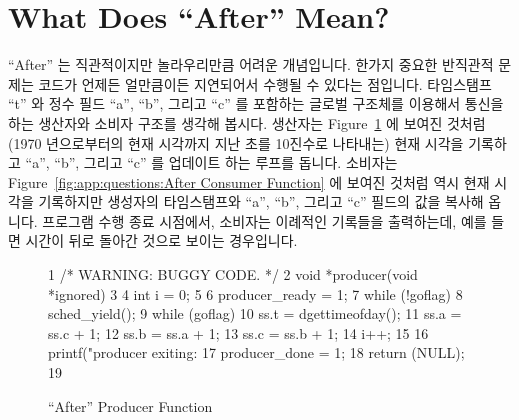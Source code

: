 
\section{What Does ``After'' Mean?}
\label{sec:app:questions:What Does ``After'' Mean?}

``After'' 는 직관적이지만 놀라우리만큼 어려운 개념입니다.
한가지 중요한 반직관적 문제는 코드가 언제든 얼만큼이든 지연되어서 수행될 수
있다는 점입니다.
타임스탬프 ``t'' 와 정수 필드 ``a'', ``b'', 그리고 ``c'' 를 포함하는 글로벌
구조체를 이용해서 통신을 하는 생산자와 소비자 구조를 생각해 봅시다.
생산자는
Figure~\ref{fig:app:questions:After Producer Function} 에 보여진 것처럼
(1970 년으로부터의 현재 시각까지 지난 초를 10진수로 나타내는) 현재 시각을
기록하고 ``a'', ``b'', 그리고 ``c'' 를 업데이트 하는 루프를 돕니다.
소비자는
Figure~\ref{fig:app:questions:After Consumer Function} 에 보여진 것처럼 역시
현재 시각을 기록하지만 생성자의 타임스탬프와 ``a'', ``b'', 그리고 ``c'' 필드의
값을 복사해 옵니다.
프로그램 수행 종료 시점에서, 소비자는 이례적인 기록들을 출력하는데, 예를 들면
시간이 뒤로 돌아간 것으로 보이는 경우입니다.
\iffalse

``After'' is an intuitive, but surprisingly difficult concept.
An important non-intuitive issue is that code can be delayed at
any point for any amount of time.
Consider a producing and a consuming thread that communicate using
a global struct with a timestamp ``t'' and integer fields ``a'', ``b'',
and ``c''.
The producer loops recording the current time
(in seconds since 1970 in decimal),
then updating the values of ``a'', ``b'', and ``c'',
as shown in Figure~\ref{fig:app:questions:After Producer Function}.
The consumer code loops, also recording the current time, but also
copying the producer's timestamp along with the fields ``a'',
``b'', and ``c'', as shown in
Figure~\ref{fig:app:questions:After Consumer Function}.
At the end of the run, the consumer outputs a list of anomalous recordings,
e.g., where time has appeared to go backwards.
\fi

\begin{figure}[htbp]
{ \scriptsize
\begin{verbbox}
  1 /* WARNING: BUGGY CODE. */
  2 void *producer(void *ignored)
  3 {
  4   int i = 0;
  5
  6   producer_ready = 1;
  7   while (!goflag)
  8     sched_yield();
  9   while (goflag) {
 10     ss.t = dgettimeofday();
 11     ss.a = ss.c + 1;
 12     ss.b = ss.a + 1;
 13     ss.c = ss.b + 1;
 14     i++;
 15   }
 16   printf("producer exiting: %
 17   producer_done = 1;
 18   return (NULL);
 19 }
\end{verbbox}
}
\centering
\theverbbox
\caption{``After'' Producer Function}
\label{fig:app:questions:After Producer Function}
\end{figure}

